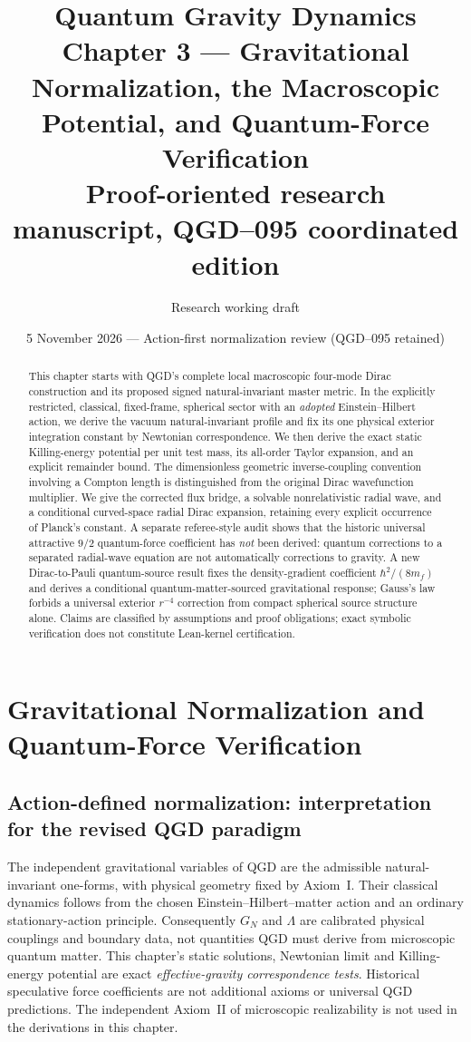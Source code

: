 \documentclass[11pt,a4paper,oneside]{report}
\title{\textbf{Quantum Gravity Dynamics}\\[5pt]\large Chapter 3 --- Gravitational Normalization, the Macroscopic Potential, and Quantum-Force Verification\\[8pt]\normalsize Proof-oriented research manuscript, QGD--095 coordinated edition}
\author{Research working draft}
\date{5 November 2026 --- Action-first normalization review (QGD--095 retained)}
\numberwithin{equation}{chapter}
\theoremstyle{definition}\newtheorem{definition}[theorem]{Definition}
\theoremstyle{remark}\newtheorem{remark}[theorem]{Remark}
\begin{document}
\maketitle
\tableofcontents
\clearpage
\chapter{Gravitational Normalization and Quantum-Force Verification}
\label{ch:normalization}
\begin{abstract}
This chapter starts with QGD's complete local macroscopic four-mode Dirac construction and its proposed signed natural-invariant master metric. In the explicitly restricted, classical, fixed-frame, spherical sector with an \emph{adopted} Einstein--Hilbert action, we derive the vacuum natural-invariant profile and fix its one physical exterior integration constant by Newtonian correspondence. We then derive the exact static Killing-energy potential per unit test mass, its all-order Taylor expansion, and an explicit remainder bound. The dimensionless geometric inverse-coupling convention involving a Compton length is distinguished from the original Dirac wavefunction multiplier. We give the corrected flux bridge, a solvable nonrelativistic radial wave, and a conditional curved-space radial Dirac expansion, retaining every explicit occurrence of Planck's constant. A separate referee-style audit shows that the historic universal attractive $9/2$ quantum-force coefficient has \emph{not} been derived: quantum corrections to a separated radial-wave equation are not automatically corrections to gravity. A new Dirac-to-Pauli quantum-source result fixes the density-gradient coefficient $\hbar^2/(8m_f)$ and derives a conditional quantum-matter-sourced gravitational response; Gauss's law forbids a universal exterior $r^{-4}$ correction from compact spherical source structure alone. Claims are classified by assumptions and proof obligations; exact symbolic verification does not constitute Lean-kernel certification.
\end{abstract}

\section*{Action-defined normalization: interpretation for the revised QGD paradigm}
\noindent The independent gravitational variables of QGD are the admissible natural-invariant one-forms, with physical geometry fixed by Axiom~I. Their classical dynamics follows from the chosen Einstein--Hilbert--matter action and an ordinary stationary-action principle. Consequently $G_N$ and $\Lambda$ are calibrated physical couplings and boundary data, not quantities QGD must derive from microscopic quantum matter. This chapter's static solutions, Newtonian limit and Killing-energy potential are exact \emph{effective-gravity correspondence tests}. Historical speculative force coefficients are not additional axioms or universal QGD predictions. The independent Axiom~II of microscopic realizability is not used in the derivations in this chapter.
\end{document}

